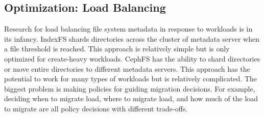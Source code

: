 \subsection{Optimization: Load Balancing}

Research for load balancing file system metadata in response to workloads is in
its infancy.  IndexFS shards directories across the cluster of metadata server
when a file threshold is reached. This approach is relatively simple but is
only optimized for create-heavy workloads. CephFS has the ability to shard
directories or move entire directories to different metadata servers. This
approach has the potential to work for many types of workloads but is
relatively complicated.  The biggest problem is making policies for guiding
migration decisions. For example, deciding when to migrate load, where to
migrate load, and how much of the load to migrate are all policy decisions with
different trade-offs.
